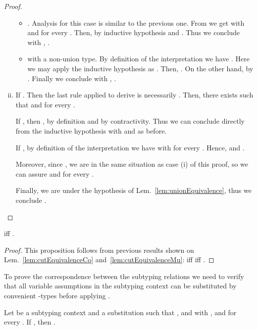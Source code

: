 \begin{proof}
\begin{enumerate}[(i)]
\begin{itemize}
    \item . Analysis for this case is similar to the
    previous one. From  we get  with  and  for every . Then, by inductive hypothesis
     and . Thus we conclude with
    , .

    \item  with  a non-union type. By definition of
    the interpretation we have .
    Here we may apply the inductive hypothesis as
    . Then,
    . On the other hand,
     by
    . Finally we conclude with ,
    .
  \end{itemize}
  
  \item If . Then the last rule applied to derive
   is necessarily
  . Then, there exists 
  such that  and
   for every .
  
  If , then ,  by definition and
   by
  contractivity. Thus we can conclude directly from the inductive hypothesis
  with  and  as before.
  
  If , by definition of the interpretation we have  with  for every . Hence,  and .
  
  Moreover, since , we are in the same situation
  as case (i) of this proof, so we can assure  and
   for every .
  
  Finally, we are under the hypothesis of Lem.~\ref{lem:unionEquivalence}, thus
  we conclude .
\end{enumerate}
\end{proof}



\begin{proposition}
\label{prop:eqtypeSoundnessAndCompleteness}
 iff .
\end{proposition}

\begin{proof}
This proposition follows from previous results shown on
Lem.~\ref{lem:cutEquivalenceCo} and~\ref{lem:cutEquivalenceMu}: 
iff  iff .
\end{proof}



To prove the correspondence between the subtyping relations we need to verify
that all variable assumptions in the subtyping context can be substituted by
convenient -types before applying .

\begin{lemma}
\label{lem:subtypeSoundnessWithHypothesis}
Let  be a subtyping context
and  a substitution such that ,  and  with ,  and  for every .
If , then .
\end{lemma}

